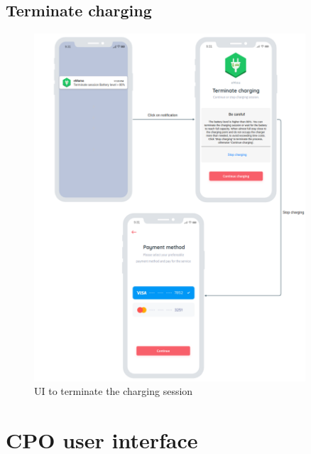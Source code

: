\subsection{Terminate charging}
\begin{figure}[H]
    \centering
    \includegraphics[width=0.9\textwidth]{Images/cp3/terminateCharging.png}
    \caption{UI to terminate the charging session}
\end{figure}

\clearpage
\section{CPO user interface}